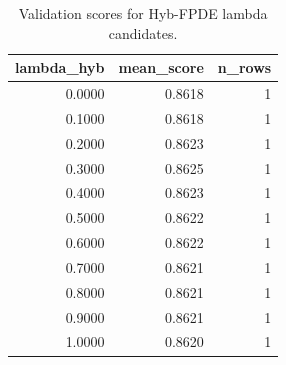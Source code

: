 \begin{table}[t]
\caption{Validation scores for Hyb-FPDE lambda candidates.}
\label{tab:lambda_distribution_computed}
\centering
\begin{tabular}{rrr}
\toprule
lambda\_hyb & mean\_score & n\_rows \\
\midrule
0.0000 & 0.8618 & 1 \\
0.1000 & 0.8618 & 1 \\
0.2000 & 0.8623 & 1 \\
0.3000 & 0.8625 & 1 \\
0.4000 & 0.8623 & 1 \\
0.5000 & 0.8622 & 1 \\
0.6000 & 0.8622 & 1 \\
0.7000 & 0.8621 & 1 \\
0.8000 & 0.8621 & 1 \\
0.9000 & 0.8621 & 1 \\
1.0000 & 0.8620 & 1 \\
\bottomrule
\end{tabular}

\end{table}
